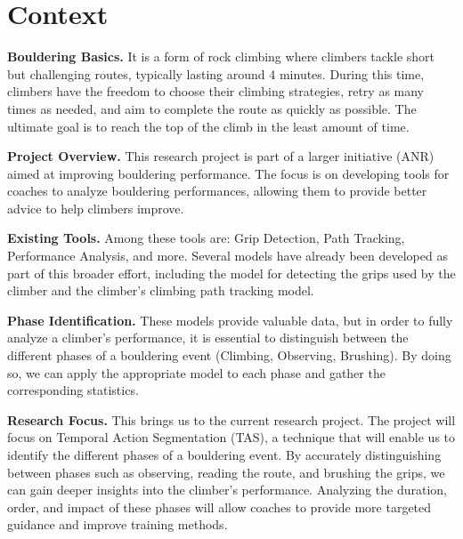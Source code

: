\newpage
\section{Context}
\label{section:context}

\noindent\textbf{Bouldering Basics.} 
It is a form of rock climbing where climbers tackle short but challenging routes, typically lasting around 4 minutes. During this time, climbers have the freedom to choose their climbing strategies, retry as many times as needed, and aim to complete the route as quickly as possible. The ultimate goal is to reach the top of the climb in the least amount of time.

\noindent\textbf{Project Overview.} 
This research project is part of a larger initiative (ANR) aimed at improving bouldering performance. The focus is on developing tools for coaches to analyze bouldering performances, allowing them to provide better advice to help climbers improve.

\noindent\textbf{Existing Tools.} 
Among these tools are: Grip Detection, Path Tracking, Performance Analysis, and more. Several models have already been developed as part of this broader effort, including the model for detecting the grips used by the climber and the climber's climbing path tracking model.

\noindent\textbf{Phase Identification.} 
These models provide valuable data, but in order to fully analyze a climber's performance, it is essential to distinguish between the different phases of a bouldering event (Climbing, Observing, Brushing). By doing so, we can apply the appropriate model to each phase and gather the corresponding statistics.

\noindent\textbf{Research Focus.} 
This brings us to the current research project. The project will focus on Temporal Action Segmentation (TAS), a technique that will enable us to identify the different phases of a bouldering event. By accurately distinguishing between phases such as observing, reading the route, and brushing the grips, we can gain deeper insights into the climber's performance. Analyzing the duration, order, and impact of these phases will allow coaches to provide more targeted guidance and improve training methods.

